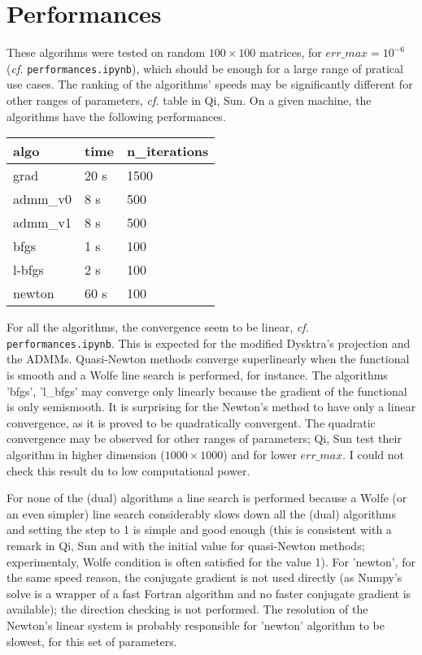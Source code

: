 \documentclass{article}
\begin{document}
\section{Performances}

These algorihms were tested on random $100 \times 100$ matrices, for $err\_max =10^{-6}$ (\emph{cf.} \texttt{performances.ipynb}), which should be enough for a large range of pratical use cases. The ranking of the algorithms' speeds may be significantly different for other ranges of parameters, \emph{cf.} table in Qi, Sun. On a given machine, the algorithms have the following performances.

\medskip

\begin{center}
\begin{tabular}{lll}
 algo     & time  & n\_iterations \\ \hline
 grad     & 20 s  & 1500          \\
 admm\_v0 & 8 s   & 500           \\
 admm\_v1 & 8 s   & 500           \\
 bfgs     & 1 s   & 100           \\
 l-bfgs   & 2 s   & 100           \\
 newton   & 60 s  & 100           \\
\end{tabular}
\end{center}

\medskip

For all the algorithms, the convergence seem to be linear, \emph{cf.} \texttt{performances.ipynb}. This is expected for the modified Dysktra's projection and the ADMMs. Quasi-Newton methods converge superlinearly when the functional is smooth and a Wolfe line search is performed, for instance. The algorithms 'bfgs', 'l\_bfgs' may converge only linearly because the gradient of the functional is only semismooth. It is surprising for the Newton's method to have only a linear convergence, as it is proved to be quadratically convergent. The quadratic convergence may be observed for other ranges of parameters; Qi, Sun test their algorithm in higher dimension ($1000 \times 1000$) and for lower $err\_max$. I could not check this result du to low computational power.

\medskip

For none of the (dual) algorithms a line search is performed because a Wolfe (or an even simpler) line search considerably slows down all the (dual) algorithms and setting the step to 1 is simple and good enough (this is consistent with a remark in Qi, Sun and with the initial value for quasi-Newton methods; experimentaly, Wolfe condition is often satisfied for the value 1). For 'newton', for the same speed reason, the conjugate gradient is not used directly (as Numpy's solve is a wrapper of a fast Fortran algorithm and no faster conjugate gradient is available); the direction checking is not performed. The resolution of the Newton's linear system is probably responsible for 'newton' algorithm to be slowest, for this set of parameters.
\end{document}
